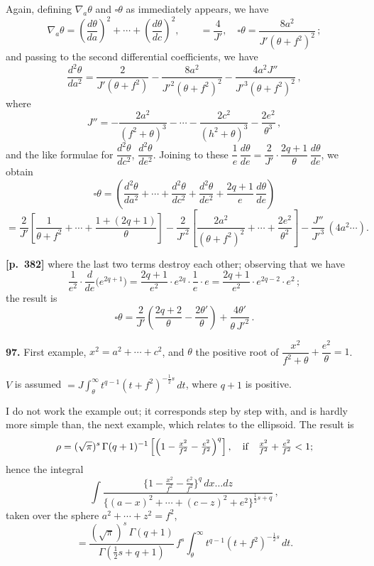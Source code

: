\documentclass[11pt,a4paper]{article}
\begin{document}
Again, defining $\nabla_{a}\theta$ and $\square\theta$ as immediately appears, we have
\[
\nabla_{a}\theta = \left(\frac{d\theta}{da}\right)^{2} + \cdots + \left(\frac{d\theta}{dc}\right)^{2}, \qquad = \frac{4}{J'},\quad \square\theta = \frac{8a^{2}}{J'(\theta+f^{2})^{2}}\,;
\]
and passing to the second differential coefficients, we have
\[
\frac{d^{2}\theta}{da^{2}} = \frac{2}{J'(\theta+f^{2})} - \frac{8a^{2}}{J'^{2}(\theta+f^{2})^{2}} - \frac{4a^{2}J''}{J'^{3}(\theta+f^{2})^{2}}\,,
\]
where
\[
J'' = -\frac{2a^{2}}{(f^{2}+\theta)^{3}} - \cdots - \frac{2c^{2}}{(h^{2}+\theta)^{3}} - \frac{2e^{2}}{\theta^{3}}\,,
\]
and the like formulae for $\dfrac{d^{2}\theta}{dc^{2}}$, $\dfrac{d^{2}\theta}{de^{2}}$. Joining to these $\dfrac{1}{e}\,\dfrac{d\theta}{de} = \dfrac{2}{J'}\cdot\dfrac{2q+1}{\theta}\,\dfrac{d\theta}{de}$, we obtain
\[
\square\theta = \left( \frac{d^{2}\theta}{da^{2}} + \cdots + \frac{d^{2}\theta}{dc^{2}} + \frac{d^{2}\theta}{de^{2}} + \frac{2q+1}{e}\,\frac{d\theta}{de} \right)
\]
\[
= \frac{2}{J'}\left[ \frac{1}{\theta+f^{2}} + \cdots + \frac{1 + (2q+1)}{\theta} \right]
- \frac{2}{J'^{2}}\left[ \frac{2a^{2}}{(\theta+f^{2})^{2}} + \cdots + \frac{2e^{2}}{\theta^{2}} \right]
- \frac{J''}{J'^{3}}\,(4a^{2}\cdots).
\]

\noindent\textbf{[p.~382]}\quad
where the last two terms destroy each other; observing that we have
\[
\frac{1}{e^{2}}\cdot\frac{d}{de}\bigl(e^{2q+1}\bigr) = \frac{2q+1}{e^{2}}\cdot e^{2q}\cdot\frac{1}{e}\cdot e = \frac{2q+1}{e^{2}}\cdot e^{2q-2}\cdot e^{2}\,;
\]
the result is
\[
\square\theta = \frac{2}{J'}\left( \frac{2q+2}{\theta} - \frac{2\theta'}{\theta} \right) + \frac{4\theta'}{\theta\,J'^{2}}\,.
\]

\textbf{97.} First example, $x^{2} = a^{2} + \cdots + c^{2}$, and $\theta$ the positive root of $\dfrac{x^{2}}{f^{2}+\theta} + \dfrac{e^{2}}{\theta} = 1$.

\smallskip
$V$ is assumed $= J\int_{\theta}^{\infty} t^{q-1}(t+f^{2})^{-\tfrac{1}{2}s}\,dt$, where $q+1$ is positive.

I do not work the example out; it corresponds step by step with, and is hardly more simple than, the next example, which relates to the ellipsoid. The result is
\[
\rho = (\sqrt{\pi})^{s}\,\Gamma(q+1)^{-1}\left[\Bigl(1 - \tfrac{x^{2}}{f^{2}} - \tfrac{e^{2}}{f^{2}}\Bigr)^{q}\right],
\quad\text{if}\quad \tfrac{x^{2}}{f^{2}} + \tfrac{e^{2}}{f^{2}} < 1;
\]
hence the integral
\[
\int \frac{\bigl\{ 1 - \tfrac{x^{2}}{f^{2}} - \tfrac{e^{2}}{f^{2}} \bigr\}^{q}\, dx\ldots dz}{\bigl\{(a-x)^{2} + \cdots + (c-z)^{2} + e^{2}\bigr\}^{\tfrac{1}{2}s+q}}\,,
\]
taken over the sphere $a^{2} + \cdots + z^{2} = f^{2}$,
\[
= \frac{(\sqrt{\pi})^{s}\,\Gamma(q+1)}{\Gamma(\tfrac{1}{2}s + q + 1)}\, f^{s}\int_{\theta}^{\infty} t^{q-1}(t+f^{2})^{-\tfrac{1}{2}s}\,dt.
\]
\end{document}
